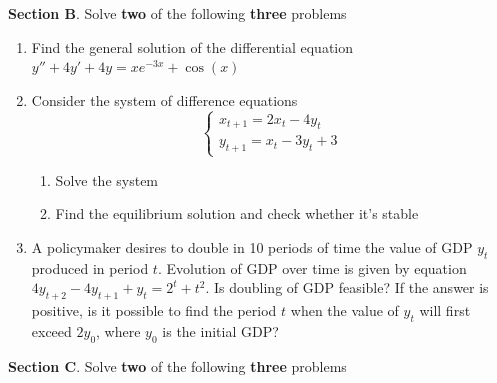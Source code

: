 \documentclass[12pt]{article} %
\theoremstyle{definition} %
\begin{document}
\vspace{12pt}

\textbf{Section B}. Solve \textbf{two} of the following \textbf{three} problems

\vspace{12pt}

\begin{enumerate}[resume]
\item Find the general solution of the differential equation $y''+4y'+4y=xe^{-3x}+\cos(x)$
\item Consider the system of difference equations
$$
\left\{ \begin{array}{l}
x_{t+1}=2x_t-4y_t \\
y_{t+1}=x_t-3y_t+3
\end{array} \right.
$$
\begin{enumerate}
\item Solve the system
\item Find the equilibrium solution and check whether it's stable
\end{enumerate}

\item A policymaker desires to double in 10 periods of time the value of GDP $y_t$  produced in period $t$. Evolution of GDP over time is given by equation $4y_{t+2}-4y_{t+1}+y_t=2^t+t^2$. Is doubling of GDP feasible? If the answer is positive, is it possible to find the period $t$ when the value of $y_t$  will first exceed $2y_0$, where $y_0$ is the initial GDP?



\end{enumerate}

\vspace{12pt}

\textbf{Section C}. Solve \textbf{two} of the following \textbf{three} problems

\vspace{12pt}
\end{document}
